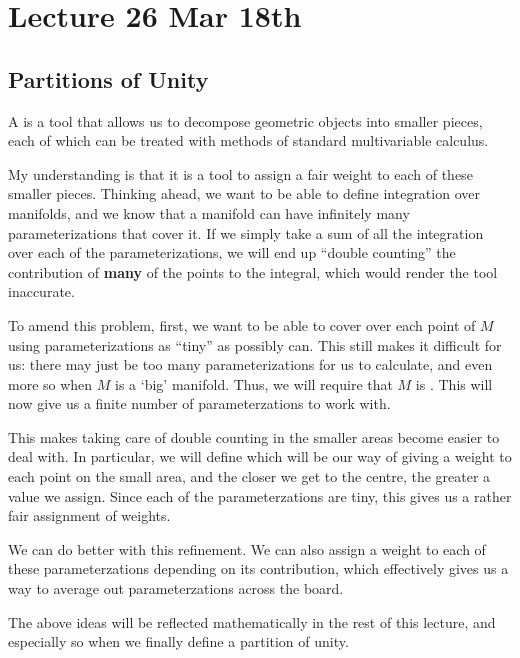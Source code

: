\documentclass[notoc,notitlepage]{tufte-book}
\begin{document}


\label{part:stokes_theorem_and_derham_cohomology}

\chapter{Lecture 26 Mar 18th}%
\label{chp:lecture_26_mar_18th}

\section{Partitions of Unity}%
\label{sec:partitions_of_unity}

A  is a tool that allows us to decompose geometric
objects into smaller pieces, each of which can be treated with methods of
standard multivariable calculus.

\begin{note}\label{note:why_partitions_of_unity}
My understanding is that it is a tool to assign a fair weight to each of these
smaller pieces. Thinking ahead, we want to be able to define integration over
manifolds, and we know that a manifold can have infinitely many
parameterizations that cover it. If we simply take a sum of all the integration
over each of the parameterizations, we will end up ``double counting'' the
contribution of \textbf{many} of the points to the integral, which would render
the tool inaccurate.

To amend this problem, first, we want to be able to cover over each point of
$M$ using parameterizations as ``tiny'' as possibly can. This still makes it
difficult for us: there may just be too many parameterizations for us to
calculate, and even more so when $M$ is a `big' manifold. Thus, we will require
that $M$ is . This will now give us a finite number of
parameterzations to work with.

This makes taking care of double counting in the smaller areas become easier to
deal with. In particular, we will define  which
will be our way of giving a weight to each point on the small area, and the
closer we get to the centre, the greater a value we assign. Since each of the
parameterzations are tiny, this gives us a rather fair assignment of weights.

We can do better with this refinement. We can also assign a weight to each of
these parameterzations depending on its contribution, which effectively gives us
a way to average out parameterzations across the board.

The above ideas will be reflected mathematically in the rest of this lecture,
and especially so when we finally define a partition of unity.
\end{note}
\end{document}
